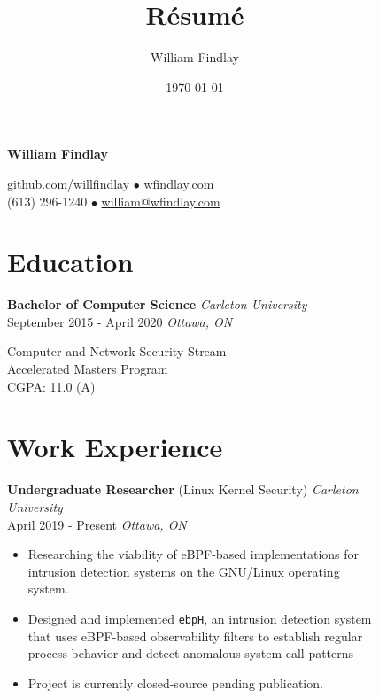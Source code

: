 \documentclass[]{article}
\title{Résumé}
\author{William Findlay}
\date{\today}
\theoremstyle{plain}
\theoremstyle{remark}
\theoremstyle{definition}
\renewcommand{\maketitle}{\relax}
\begin{document}
\maketitle

\begin{figure}
\small
\begin{minipage}[t]{0.65\textwidth}
\begin{center}
{\Huge\bfseries {\color{gray}William} Findlay}

\color{gray}

\href{https://www.github.com/willfindlay}{\color{gray}github.com/willfindlay} $\bullet$ \href{http://www.wfindlay.com}{\color{gray}wfindlay.com}\\
{\color{gray}(613) 296-1240} $\bullet$ \href{mailto:william@wfindlay.com}{\color{gray}william@wfindlay.com}
\end{center}

\color{gray}

\section{Education}
\color{black}
\textbf{Bachelor of Computer Science} \hfill \emph{Carleton University}\\
{September 2015 - April 2020} \hfill\emph {Ottawa, ON}
\color{gray}

Computer and Network Security Stream\\
Accelerated Masters Program\\
CGPA: 11.0 (A)

\section{Work Experience}

\color{black}
\textbf{Undergraduate Researcher} (Linux Kernel Security) \hfill \emph{Carleton University}\\
April 2019 - Present \hfill\emph {Ottawa, ON}
\color{gray}
\begin{itemize}[itemsep=0em]
\item Researching the viability of eBPF-based implementations for intrusion detection systems on the GNU/Linux operating system.
\item Designed and implemented \texttt{ebpH}, an intrusion detection system that uses eBPF-based observability filters to establish regular process behavior and detect anomalous system call patterns
\item Project is currently closed-source pending publication.
\end{itemize}


\end{minipage}
\end{figure}
\end{document}
